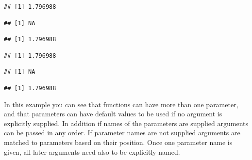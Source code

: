 \documentclass[krantz2]{krantz}\usepackage{knitr}%
\begin{document}
\begin{knitrout}\footnotesize
{}\color{fgcolor}\begin{kframe}
\begin{alltt}
 \hlkwb{<-} \hlstd{(}\hlstd{,}  \hlstd{=} \hlstd{)\{}
  \hlstd{(}   \hlopt{/} \hlstd{(}
\hlstd{\}}
\end{alltt}
\begin{verbatim}
## [1] 1.796988
\end{verbatim}
\begin{alltt}
\end{alltt}
\begin{verbatim}
## [1] NA
\end{verbatim}
\begin{alltt}
 \hlstd{)}
\end{alltt}
\begin{verbatim}
## [1] 1.796988
\end{verbatim}
\begin{alltt}
\hlstd{(}   \hlstd{=} \hlstd{)}
\end{alltt}
\begin{verbatim}
## [1] 1.796988
\end{verbatim}
\begin{alltt}
\hlstd{(}
\end{alltt}


{\ttfamily\noindent{}}\begin{verbatim}
## [1] NA
\end{verbatim}
\begin{alltt}
\hlstd{(} \hlstd{=} \hlstd{,}  
\end{alltt}
\begin{verbatim}
## [1] 1.796988
\end{verbatim}
\end{kframe}
\end{knitrout}

In this example you can see that functions can have more than one parameter, and that parameters can have default values to be used if no
argument is explicitly supplied. In addition if names of the parameters are supplied arguments can be passed in any order.
If parameter names are not supplied arguments are matched to parameters based on their position. Once one parameter name is given, all
later arguments need also to be explicitly named.
\end{document}
